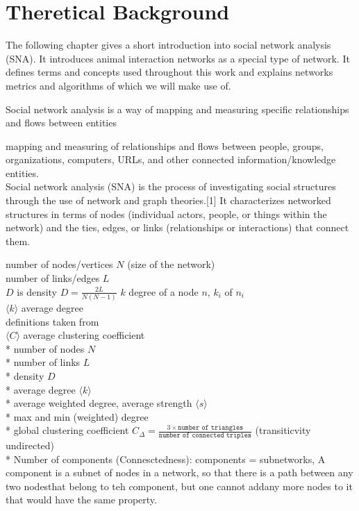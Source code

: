 \chapter{Theretical Background}
The following chapter gives a short introduction into social network analysis (SNA). It introduces animal interaction networks as a special type of network. It defines terms and concepts used throughout this work and explains networks metrics and algorithms of which we will make use of.

Social network analysis is a way of mapping and measuring specific relationships and flows between entities

mapping and measuring of relationships and flows between people, groups, organizations, computers, URLs, and other connected information/knowledge entities. 
\\
Social network analysis (SNA) is the process of investigating social structures through the use of network and graph theories.[1] It characterizes networked structures in terms of nodes (individual actors, people, or things within the network) and the ties, edges, or links (relationships or interactions) that connect them. 
 
number of nodes/vertices $N$ (size of the network)\\
number of links/edges $L$\\
$D$ is density $D=\frac{2L}{N(N-1)}$
$k$ degree of a node $n$, $k_i$ of $n_i$\\
$ \langle k  \rangle$ average degree\\
definitions taken from~\textcite{barabasi2016network}\\

$\langle C \rangle$ average clustering coefficient\\

* number of nodes $N$\\
* number of links $L$\\
* density $D$\\
* average degree $ \langle k  \rangle$\\
* average weighted degree, average strength $\langle s \rangle$\\ 
* max and min (weighted) degree\\
* global clustering coefficient $C_\Delta = \frac{3 \times \texttt{number of triangles}}{\texttt{number of connected triples}}$ (transiticvity undirected)~\cite{wasserman1994social}\\

* Number of components (Connesctedness): components = subnetworks, A component is a subnet of nodes in a network, so that there is a path between any two nodesthat belong to teh component, but one cannot addany more nodes to it that would have the same property.\\

